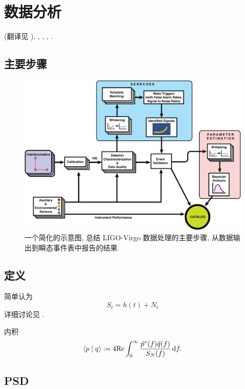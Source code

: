 \chapter{数据分析}

\def\la{\langle}
\def\ra{\rangle}
\cite{Abbott2020} (翻译见 ). \cite{Maggiore2014}, \cite{Jaranowski2012,Jaranowski2009}, \cite{Finn1992}, \cite{Thrane2019}.

\section{主要步骤}

\begin{figure}[htbp]
    \centering
    \includegraphics[width=\textwidth]{image/data_processing_main_steps.jpg}
    \caption{
        一个简化的示意图, 总结 LIGO-Virgo 数据处理的主要步骤, 从数据输出到瞬态事件表中报告的结果. 
    }
\end{figure}

\section{定义}

简单认为
\begin{equation}
    S_t=h(t)+N_t
\end{equation}
详细讨论见 \cite{Maggiore2014}.

内积
\begin{equation}
    \la p\mid q \ra:=4\t{Re}\int_0^\infty\frac{\tilde{p}^*(f)\tilde{q}(f)}{S_{N}(f)}\,\d f.
\end{equation}

\section{PSD}

